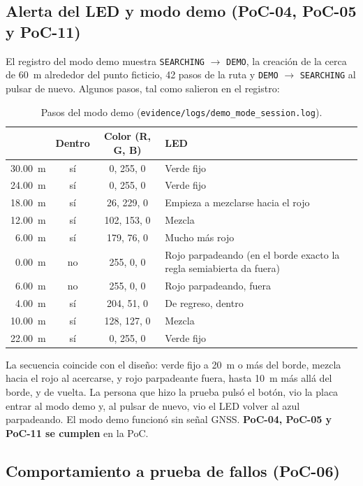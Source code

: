\subsection{Alerta del LED y modo demo (PoC-04, PoC-05 y PoC-11)}

El registro del modo demo muestra \texttt{SEARCHING} $\to$ \texttt{DEMO}, la creación de la cerca de 60~m
alrededor del punto ficticio, 42 pasos de la ruta y \texttt{DEMO} $\to$ \texttt{SEARCHING} al pulsar de
nuevo. Algunos pasos, tal como salieron en el registro:

\begin{table}[H]
\centering
\small
\begin{tabularx}{\textwidth}{|r c c X|}
\hline
\tablehead{\textbf{Distancia al borde} & \textbf{Dentro} & \textbf{Color (R, G, B)} & \textbf{LED}} \\ \hline
30.00~m & sí & 0, 255, 0 & Verde fijo \\ \hline
24.00~m & sí & 0, 255, 0 & Verde fijo \\ \hline
18.00~m & sí & 26, 229, 0 & Empieza a mezclarse hacia el rojo \\ \hline
12.00~m & sí & 102, 153, 0 & Mezcla \\ \hline
6.00~m & sí & 179, 76, 0 & Mucho más rojo \\ \hline
0.00~m & no & 255, 0, 0 & Rojo parpadeando (en el borde exacto la regla semiabierta da fuera) \\ \hline
6.00~m & no & 255, 0, 0 & Rojo parpadeando, fuera \\ \hline
4.00~m & sí & 204, 51, 0 & De regreso, dentro \\ \hline
10.00~m & sí & 128, 127, 0 & Mezcla \\ \hline
22.00~m & sí & 0, 255, 0 & Verde fijo \\ \hline
\end{tabularx}
\caption{Pasos del modo demo (\texttt{evidence/logs/demo\_mode\_session.log}).}
\end{table}

La secuencia coincide con el diseño: verde fijo a 20~m o más del borde, mezcla hacia el rojo al acercarse,
y rojo parpadeante fuera, hasta 10~m más allá del borde, y de vuelta. La persona que hizo la prueba pulsó el
botón, vio la placa entrar al modo demo y, al pulsar de nuevo, vio el LED volver al azul parpadeando. El
modo demo funcionó sin señal GNSS. \textbf{PoC-04, PoC-05 y PoC-11 se cumplen} en la PoC.

\subsection{Comportamiento a prueba de fallos (PoC-06)}

